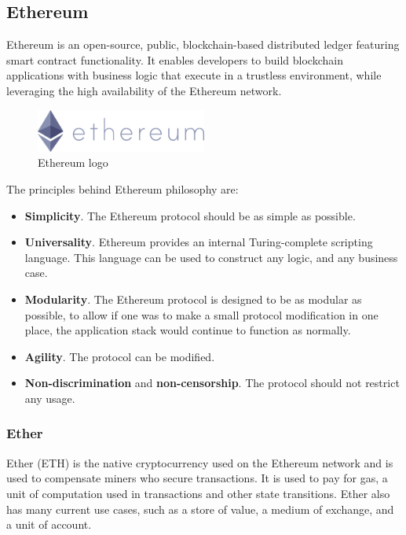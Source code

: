 \documentclass[a4paper, 12pt]{article} %
\begin{document}
    \subsection{Ethereum}
        Ethereum is an open-source, public, blockchain-based distributed ledger featuring smart contract functionality. It enables developers to build blockchain applications with business logic that execute in a trustless environment, while leveraging the high availability of the Ethereum network. 
        \begin{figure}[h]
            \centering
            \includegraphics[width=0.5\textwidth]{ethereum-logo-portrait-purple.png}
            \caption{Ethereum logo}
            \label{fig:ethereum_logo}
        \end{figure}
        The principles behind Ethereum philosophy are:
        \begin{itemize}
            \item \textbf{Simplicity}. The Ethereum protocol should be as simple as possible.
            \item \textbf{Universality}. Ethereum provides an internal Turing-complete scripting language. This language can be used to construct any logic, and any business case.
            \item \textbf{Modularity}. The Ethereum protocol is designed to be as modular as possible, to allow if one was to make a small protocol modification in one place, the application stack would continue to function as normally. 
            \item \textbf{Agility}. The protocol can be modified.
            \item \textbf{Non-discrimination} and \textbf{non-censorship}. The protocol should not restrict any usage.
        \end{itemize}
        
        \subsubsection{Ether}
            Ether (ETH) is the native cryptocurrency used on the Ethereum network and is used to compensate miners who secure transactions. It is used to pay for gas, a unit of computation used in transactions and other state transitions.
            Ether also has many current use cases, such as a store of value, a medium of exchange, and a unit of account.
            
\end{document}
